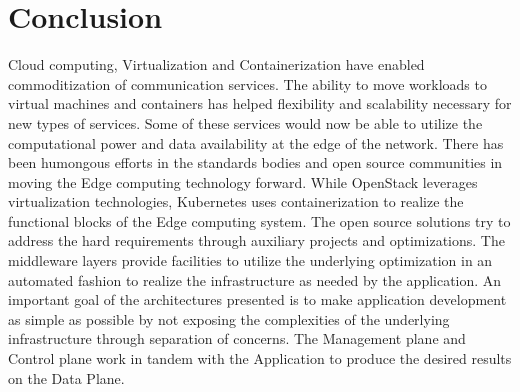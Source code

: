 \section{Conclusion}

Cloud computing, Virtualization and Containerization have enabled commoditization of communication services. The ability to move workloads to virtual machines and containers has helped flexibility and scalability necessary for new types of services. Some of these services would now be able to utilize the computational power and data availability at the edge of the network. There has been humongous efforts in the standards bodies and open source communities in moving the Edge computing technology forward. While OpenStack leverages virtualization technologies, Kubernetes uses containerization to realize the functional blocks of the Edge computing system. The open source solutions try to address the hard requirements through auxiliary projects and optimizations. The middleware layers provide facilities to utilize the underlying optimization in an automated fashion to realize the infrastructure as needed by the application. An important goal of the architectures presented is to make application development as simple as possible by not exposing the complexities of the underlying infrastructure through separation of concerns. The Management plane and Control plane work in tandem with the Application to produce the desired results on the Data Plane.



